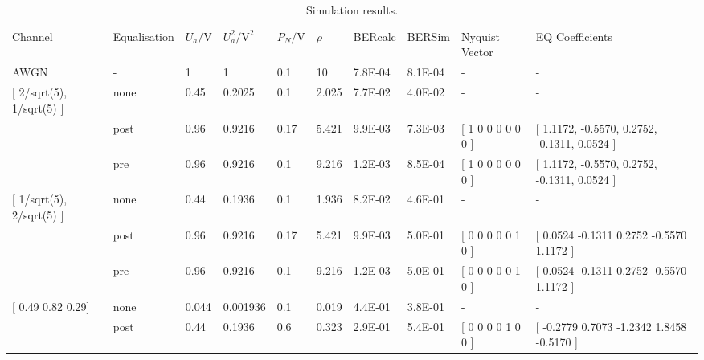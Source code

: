 \begin{sidewaystable}[]
\begin{tabular}{llllllllll}
\rowcolor{gray-2}
Channel                      & Equalisation & $U_{a} / \si{\volt}$ & $U_{a}^2 / \si{\volt\squared}$ & $P_N / \si{\volt}$ & $\rho$ & BERcalc & BERSim  & Nyquist Vector        & EQ Coefficients                                  \\
\rowcolor{yellow-1}
AWGN                         & -            & 1                    & 1                              & 0.1                & 10     & 7.8E-04 & 8.1E-04 & -                     & -                                                \\
\rowcolor{green-1}
{[} 2/sqrt(5), 1/sqrt(5) {]} & none         & 0.45                 & 0.2025                         & 0.1                & 2.025  & 7.7E-02 & 4.0E-02 & -                     & -                                                \\
\rowcolor{green-1}
                             & post         & 0.96                 & 0.9216                         & 0.17               & 5.421  & 9.9E-03 & 7.3E-03 & {[} 1 0 0 0 0 0 0 {]} & {[} 1.1172, -0.5570, 0.2752, -0.1311, 0.0524 {]} \\
\rowcolor{green-1}
                             & pre          & 0.96                 & 0.9216                         & 0.1                & 9.216  & 1.2E-03 & 8.5E-04 & {[} 1 0 0 0 0 0 0 {]} & {[} 1.1172, -0.5570, 0.2752, -0.1311, 0.0524 {]} \\
\rowcolor{blue-1}
{[} 1/sqrt(5), 2/sqrt(5) {]} & none         & 0.44                 & 0.1936                         & 0.1                & 1.936  & 8.2E-02 & 4.6E-01 & -                     & -                                                \\
\rowcolor{blue-1}
                             & post         & 0.96                 & 0.9216                         & 0.17               & 5.421  & 9.9E-03 & 5.0E-01 & {[} 0 0 0 0 0 1 0 {]} & {[} 0.0524 -0.1311 0.2752 -0.5570 1.1172 {]}     \\
\rowcolor{blue-1}
                             & pre          & 0.96                 & 0.9216                         & 0.1                & 9.216  & 1.2E-03 & 5.0E-01 & {[} 0 0 0 0 0 1 0 {]} & {[} 0.0524 -0.1311 0.2752 -0.5570 1.1172 {]}     \\
\rowcolor{red-1}
{[} 0.49 0.82 0.29{]}        & none         & 0.044                & 0.001936                       & 0.1                & 0.019  & 4.4E-01 & 3.8E-01 & -                     & -                                                \\
\rowcolor{red-1}
                             & post         & 0.44                 & 0.1936                         & 0.6                & 0.323  & 2.9E-01 & 5.4E-01 & {[} 0 0 0 0 1 0 0 {]} & {[} -0.2779 0.7073 -1.2342 1.8458 -0.5170 {]}
\end{tabular}
\caption{Simulation results.}\label{tab:sim_results}
\end{sidewaystable}
